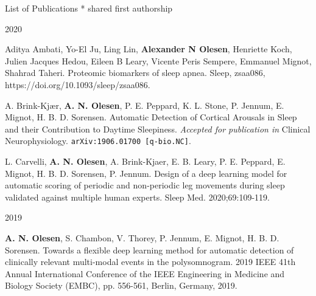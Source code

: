 \documentclass{resume} %
\begin{document}
\begin{rSection}{List of Publications}
	\medskip
    \mbox{*} shared first authorship
    
    \begin{rSubsection}{2020}{}{}{}
        \item Aditya Ambati, Yo-El Ju, Ling Lin, \textbf{Alexander N Olesen}, Henriette Koch, Julien Jacques Hedou, Eileen B Leary, Vicente Peris Sempere, Emmanuel Mignot, Shahrad Taheri. Proteomic biomarkers of sleep apnea. Sleep, zsaa086, https://doi.org/10.1093/sleep/zsaa086. \medskip
        \item A. Brink-Kjær, \textbf{A. N. Olesen}, P. E. Peppard, K. L. Stone, P. Jennum, E. Mignot, H. B. D. Sorensen. Automatic Detection of Cortical Arousals in Sleep and their Contribution to Daytime Sleepiness. \textit{Accepted for publication in} Clinical Neurophysiology. \texttt{arXiv:1906.01700 [q-bio.NC]}.\medskip
	    \item L. Carvelli, \textbf{A. N. Olesen}, A. Brink-Kjaer, E. B. Leary, P. E. Peppard, E. Mignot, H. B. D. Sorensen, P. Jennum. Design of a deep learning model for automatic scoring of periodic and non-periodic leg movements during sleep validated against multiple human experts. Sleep Med. 2020;69:109-119.
	\end{rSubsection}
    
	\begin{rSubsection}{2019}{}{}{}
	    \item \textbf{A. N. Olesen}, S. Chambon, V. Thorey, P. Jennum, E. Mignot, H. B. D. Sorensen. Towards a flexible deep learning method for automatic detection of clinically relevant multi-modal events in the polysomnogram. 2019 IEEE 41th Annual International Conference of the IEEE Engineering in Medicine and Biology Society (EMBC), pp. 556-561, Berlin, Germany, 2019.
	\end{rSubsection}
	

\end{rSection}
\end{document}

